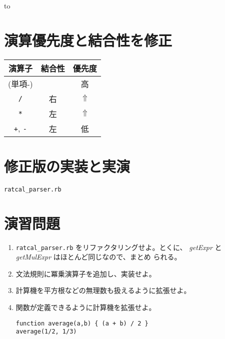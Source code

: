 \documentclass[slide,papersize,fleqn,22pt]{jsarticle}
\begin{document}
\hbox to 


\section{演算優先度と結合性を修正}
\normalsize
\begin{center}
\begin{tabular}{ccc}
  \hline
  \strut 演算子 & 結合性 & 優先度 \\
\hline
  (単項-) & & 高 \\
  \texttt{/} & 右 & $\Uparrow$\\
  \texttt{*} & 左 & $\Uparrow$\\
  \texttt{+}, \texttt{-} & 左 & 低\\
  \hline
\end{tabular}
\end{center}

\section{修正版の実装と実演}
\texttt{ratcal\_parser.rb}

\section{演習問題}
\footnotesize
\begin{enumerate}
\item \texttt{ratcal\_parser.rb} をリファクタリングせよ。とくに、
  \textsl{getExpr} と \textsl{getMulExpr} はほとんど同じなので、まとめ
  られる。

\item 文法規則に冪乗演算子を追加し、実装せよ。

\item 計算機を平方根などの無理数も扱えるように拡張せよ。
\item 関数が定義できるように計算機を拡張せよ。
\begin{verbatim}
function average(a,b) { (a + b) / 2 }
average(1/2, 1/3)
\end{verbatim}
\end{enumerate}
\normalsize
\end{document}
